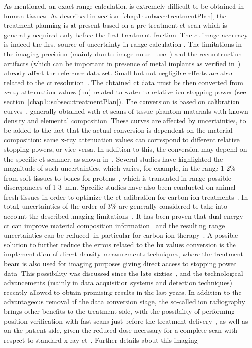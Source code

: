 As mentioned, an exact range calculation is extremely difficult to be obtained in human tissues. As described in section~\ref{chap1::subsec::treatmentPlan}, the treatment planning is at present based on a pre-treatment \gls{ct} scan which is generally acquired only before the first treatment fraction. The \gls{ct} image accuracy is indeed the first source of uncertainty in range calculation . The limitations in the imaging precision (mainly due to image noise - see~\cite{Chvetsov2010}) and the reconstruction artifacts (which can be important in presence of metal implants as verified in~\cite{Jakel2007, Newhauser2007}) already affect the reference data set. Small but not negligible effects are also related to the \gls{ct} resolution~\parencite{Espana2011}. The obtained \gls{ct} data must be then converted from x-ray attenuation values (\gls{hu}) related to water to relative ion stopping power (see section~\ref{chap1::subsec::treatmentPlan}). The conversion is based on calibration curves~\parencite{Schneider1996, Schneider2000}, generally obtained with \gls{ct} scans of tissue phantom materials with known density and elemental composition. These curves are affected by uncertainties, to be added to the fact that the actual conversion is dependent on the material composition: same x-ray attenuation values can correspond to different relative stopping powers, or vice versa. In addition to this, the conversion may depend on the specific \gls{ct} scanner, as shown in~\cite{Ainsley2014}. Several studies have highlighted the magnitude of such uncertainties, which varies, for example, in the range 1-2\% from soft tissues to bones for protons~\parencite{Schaffner1998b}, which is translated in range possible discrepancies of 1-3~mm. Specific studies have also been conducted on animal fresh tissues in order to optimize the \gls{ct} calibration for carbon ion treatments~\parencite{Rietzel2007}. In total, uncertainties of the order of 3\% are generally considered to take into account the described imaging limitations~\parencite{Moyers2001}. It has been proven that dual-energy \gls{ct} can improve material composition information~\parencite{Bazalova2008, Yang2010, Hunemor2014, Wohlfahrt2018} and the resulting range uncertainties can be reduced, in particular for carbon ion therapy~\parencite{Hunemor2014}. A possible solution to further reduce the errors related to the \gls{hu} values conversion is the implementation of direct density measurements techniques, where the treatment beam is also used for imaging purposes giving direct access to stopping power data. This possibility was discussed since the late sixties~\parencite{Koehler1968}, and the technological advancements (mainly in data acquisition systems and detection techniques) recently allowed to obtain promising results in the last years. In addition to the advantageous removal of the data conversion stage, the so-called ion radiography brings other benefits to the treatment side, with the possibility of performing position verification with fast scans just before the treatment delivery~\parencite{Schneider1995}, as well as on the patient side, given the reduced dose necessary for a complete scan with respect to standard x-ray \gls{ct}~\parencite{Schneider1995}. Further details about this imaging 